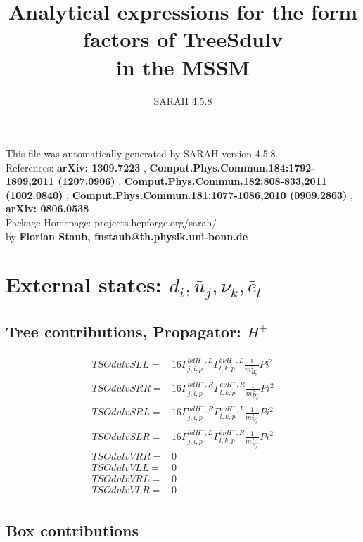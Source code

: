 \documentclass[A4,landscape]{article}
\begin{document}
\title{Analytical expressions for the form factors of TreeSdulv\\ in the MSSM } 
 \author{SARAH 4.5.8} 
 \maketitle 
 \vspace{10cm} 
This file was automatically generated by SARAH version 4.5.8.  \\ 
References: {\bf arXiv: 1309.7223 }, {\bf Comput.Phys.Commun.184:1792-1809,2011 (1207.0906) }, {\bf Comput.Phys.Commun.182:808-833,2011 (1002.0840) }, {\bf Comput.Phys.Commun.181:1077-1086,2010 (0909.2863) }, {\bf arXiv: 0806.0538 } \\ 
Package Homepage: projects.hepforge.org/sarah/ \\ 
by {\bf Florian Staub, fnstaub@th.physik.uni-bonn.de} 
 \pagebreak 
 \tableofcontents 
 \pagebreak 
\section{External states: ${d_{{i}}, \bar{u}_{{j}}, \nu_{{k}}, \bar{e}_{{l}}}$} 
\subsection{Tree contributions, Propagator: $H^+$} 

\begin{align} 
  TSOdulvSLL= & 16 \Gamma^{\bar{u}d H^+,L}_{j, i, p} \Gamma^{\bar{e}\nu H^- ,L}_{l, k, p} \frac{1}{m^2_{H^-_{{p}}}} Pi^2 \\ 
  TSOdulvSRR= & 16 \Gamma^{\bar{u}d H^+,R}_{j, i, p} \Gamma^{\bar{e}\nu H^- ,R}_{l, k, p} \frac{1}{m^2_{H^-_{{p}}}} Pi^2 \\ 
  TSOdulvSRL= & 16 \Gamma^{\bar{u}d H^+,R}_{j, i, p} \Gamma^{\bar{e}\nu H^- ,L}_{l, k, p} \frac{1}{m^2_{H^-_{{p}}}} Pi^2 \\ 
  TSOdulvSLR= & 16 \Gamma^{\bar{u}d H^+,L}_{j, i, p} \Gamma^{\bar{e}\nu H^- ,R}_{l, k, p} \frac{1}{m^2_{H^-_{{p}}}} Pi^2 \\ 
  TSOdulvVRR= & 0 \\ 
  TSOdulvVLL= & 0 \\ 
  TSOdulvVRL= & 0 \\ 
  TSOdulvVLR= & 0 \\ 
\end{align} 
\subsection{Box contributions} 
\end{document}
